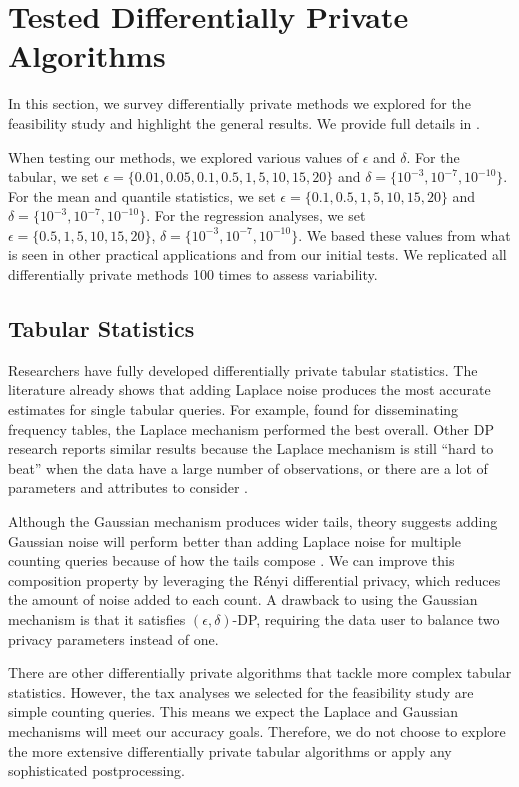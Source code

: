 \section{Tested Differentially Private Algorithms}\label{sec:dp-mech}
In this section, we survey differentially private methods we explored for the feasibility study and highlight the general results. We provide full details in \citet{barrientos2021}.

When testing our methods, we explored various values of $\epsilon$ and $\delta$. For the tabular, we set $\epsilon =\{0.01, 0.05, 0.1, 0.5, 1, 5, 10, 15, 20\}$ and $\delta=\{10^{-3},10^{-7},10^{-10}\}$. For the mean and quantile statistics, we set $\epsilon =\{0.1, 0.5, 1, 5, 10, 15, 20\}$ and $\delta=\{10^{-3},10^{-7},10^{-10}\}$. For the regression analyses, we set $\epsilon =\{0.5, 1, 5, 10, 15, 20\}$, $\delta=\{10^{-3},10^{-7},10^{-10}\}$. We based these values from what is seen in other practical applications and from our initial tests. We replicated all differentially private methods 100 times to assess variability.

\subsection{Tabular Statistics}
Researchers have fully developed differentially private tabular statistics. The literature already shows that adding Laplace noise produces the most accurate estimates for single tabular queries. For example, \citet{rinott2018confidentiality} found for disseminating frequency tables, the Laplace mechanism performed the best overall. Other DP research reports similar results because the Laplace mechanism is still ``hard to beat'' when the data have a large number of observations, or there are a lot of parameters and attributes to consider \citep{bowen2021differentially,shlomo2018statistical,liu2018generalized}.

Although the Gaussian mechanism produces wider tails, theory suggests adding Gaussian noise will perform better than adding Laplace noise for multiple counting queries because of how the tails compose \citep{wang2019subsampled}. We can improve this composition property by leveraging the R\'enyi differential privacy, which reduces the amount of noise added to each count. A drawback to using the Gaussian mechanism is that it satisfies $(\epsilon,\delta)$-DP, requiring the data user to balance two privacy parameters instead of one.

There are other differentially private algorithms that tackle more complex tabular statistics. However, the tax analyses we selected for the feasibility study are simple counting queries. This means we expect the Laplace and Gaussian mechanisms will meet our accuracy goals. Therefore, we do not choose to explore the more extensive differentially private tabular algorithms or apply any sophisticated postprocessing.

